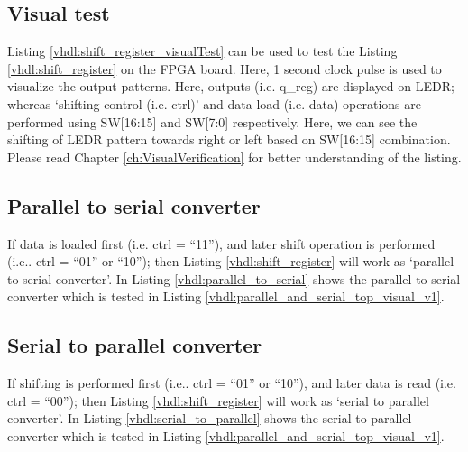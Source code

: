\subsection{Visual test}

Listing \ref{vhdl:shift_register_visualTest} can be used to test the Listing \ref{vhdl:shift_register} on the FPGA board. Here, 1 second clock pulse is used to visualize the output patterns. Here, outputs (i.e. q\_reg) are displayed on LEDR; whereas `shifting-control (i.e. ctrl)' and data-load (i.e. data) operations are performed using SW[16:15] and SW[7:0] respectively. Here, we can see the shifting of LEDR pattern towards right or left based on SW[16:15] combination. Please read Chapter \ref{ch:VisualVerification} for better understanding of the listing.



\subsection{Parallel to serial converter}
If data is loaded first (i.e. ctrl = ``11''), and later shift operation is performed (i.e.. ctrl = ``01'' or ``10''); then Listing \ref{vhdl:shift_register} will work as `parallel to serial converter'. In Listing \ref{vhdl:parallel_to_serial} shows the parallel to serial converter which is tested in Listing \ref{vhdl:parallel_and_serial_top_visual_v1}.




\subsection{Serial to parallel converter}
If shifting is performed first (i.e.. ctrl = ``01'' or ``10''), and later data is read (i.e. ctrl = ``00''); then Listing \ref{vhdl:shift_register} will work as `serial to parallel converter'. In Listing \ref{vhdl:serial_to_parallel} shows the serial to parallel converter which is tested in Listing \ref{vhdl:parallel_and_serial_top_visual_v1}.



